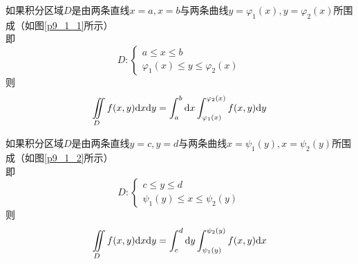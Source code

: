 如果积分区域$D$是由两条直线$x=a,x=b$与两条曲线$y=\varphi_1(x),y=\varphi_2(x)$所围成（如图\ref{p9_1_1}所示）\\
即
\begin{equation*}
    D:
    \begin{cases}
        a \leq x \leq b \\
        \varphi_1(x) \leq y \leq \varphi_2(x)
    \end{cases}
\end{equation*}
则
\begin{equation*}
    \iint \limits_{D} f(x,y)\mathrm{d} x\mathrm{d} y=\int_{a}^{b}\mathrm{d} x \int_{\varphi_1(x)}^{\varphi_2(x)} f(x,y)\mathrm{d} y
\end{equation*}

如果积分区域$D$是由两条直线$y=c,y=d$与两条曲线$x=\psi_1(y),x=\psi_2(y)$所围成（如图\ref{p9_1_2}所示）\\
即
\begin{equation*}
    D:
    \begin{cases}
        c \leq y \leq d \\
        \psi_1(y) \leq x \leq \psi_2(y)
    \end{cases}
\end{equation*}
则
\begin{equation*}
    \iint \limits_{D} f(x,y)\mathrm{d} x\mathrm{d} y=\int_{c}^{d}\mathrm{d} y \int_{\psi_1(y)}^{\psi_2(y)} f(x,y)\mathrm{d} x
\end{equation*}

